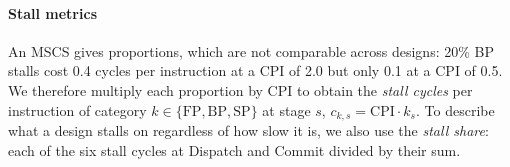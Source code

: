 \paragraph{Stall metrics}
An MSCS gives proportions, which are not comparable across designs: 20\% BP stalls cost 0.4 cycles per instruction at a CPI of 2.0 but only 0.1 at a CPI of 0.5.
%
We therefore multiply each proportion by CPI to obtain the \emph{stall cycles} per instruction of category $k \in \{\mathrm{FP}, \mathrm{BP}, \mathrm{SP}\}$ at stage $s$, $c_{k,s} = \mathrm{CPI}\cdot k_s$.
%
To describe what a design stalls on regardless of how slow it is, we also use the \emph{stall share}: each of the six stall cycles at Dispatch and Commit divided by their sum.
